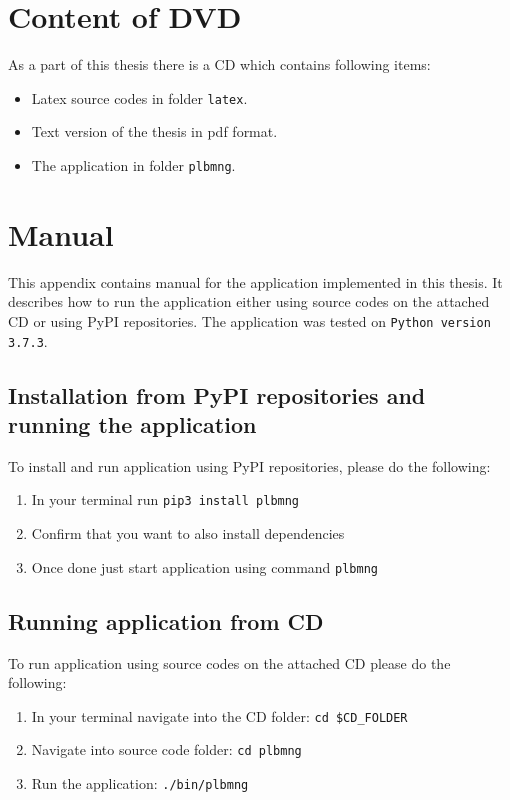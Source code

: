 \chapter{Content of DVD}
As a part of this thesis there is a CD which contains following items:
\begin{itemize}
	\item Latex source codes in folder \texttt{latex}.
	\item Text version of the thesis in pdf format.
	\item The application in folder \texttt{plbmng}.
\end{itemize}

\chapter{Manual}
This appendix contains manual for the application implemented in this thesis. It describes how to run the application either using source codes on the attached CD or using PyPI repositories. The application was tested on \texttt{Python version 3.7.3}.
\section{Installation from PyPI repositories and running the application}
To install and run application using PyPI repositories, please do the following:\\
\begin{enumerate}
	\item In your terminal run \texttt{pip3 install plbmng}
	\item Confirm that you want to also install dependencies
	\item Once done just start application using command \texttt{plbmng}
\end{enumerate}

\section{Running application from CD}
To run application using source codes on the attached CD please do the following:\\
\begin{enumerate}
	\item In your terminal navigate into the CD folder: \texttt{cd \$CD\_FOLDER}
	\item Navigate into source code folder: \texttt{cd plbmng}
	\item Run the application: \texttt{./bin/plbmng}
\end{enumerate}
